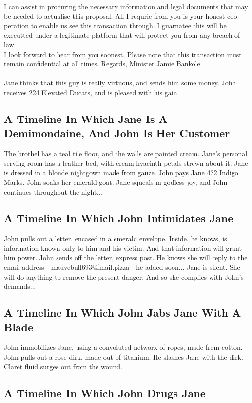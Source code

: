 \documentclass{article}
\begin{document}
\\
I can assist in procuring the necessary information and legal documents that may be needed to actualise this proposal.
All I requrie from you is your honest coo{-}peration to enable us see this transaction through.
I guarnatee this will be executted under a legitimate platform that will protect you from any breach of law.
\\
I look forward to hear from you soonest.
Please note that this transaction must remain confidential at all times.
Regards, Minister Jamie Bankole
\\\\
Jane thinks that this guy is really virtuous, and sends him some money.
John receives 224 Elevated Ducats, and is pleased with his gain.
\subsection{A Timeline In Which Jane Is A Demimondaine, And John Is Her Customer}


The brothel has a teal tile floor, and the walls are painted cream.
Jane's personal serving{-}room has a leather bed, with cream hyacinth petals strewn about it.
Jane is dressed in a blonde nightgown made from gauze.
John pays Jane 432 Indigo Marks.
John soaks her emerald goat.
Jane squeals in godless joy, and John continues throughout the night...
\subsection{A Timeline In Which John Intimidates Jane}


John pulls out a letter, encased in a emerald envelope. Inside, he knows, is information known only to him and his victim. And that information will grant him power.
John sends off the letter, express post. He knows she will reply to the email address {-} mauvebull693@fmail.pizza {-} he added soon...
Jane is silent. She will do anything to remove the present danger. And so she complies with John's demands...
\subsection{A Timeline In Which John Jabs Jane With A Blade}


John immobilizes Jane, using a convoluted network of ropes, made from cotton.
John pulls out a rose dirk, made out of titanium.
He slashes Jane with the dirk.
Claret fluid surges out from the wound.
\subsection{A Timeline In Which John Drugs Jane}
\end{document}
